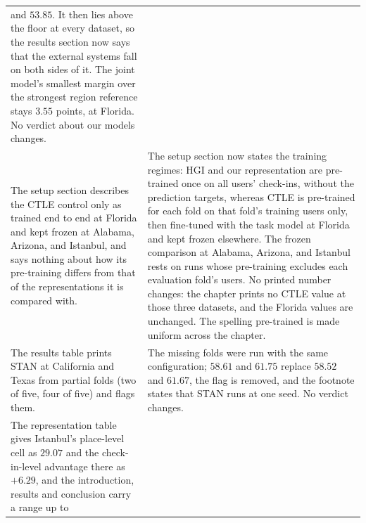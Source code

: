 \begin{table}[htb]
\begin{tabular}{@{}p{}p{}@{}}
and $53.85$. It then lies above the floor at every dataset, so
the results section now says that the external systems fall on
both sides of it. The joint model's smallest margin over the
strongest region reference stays $3.55$ points, at Florida. No
verdict about our models changes. \\
\addlinespace
The setup section describes the CTLE control only as trained
end to end at Florida and kept frozen at Alabama, Arizona, and
Istanbul, and says nothing about how its pre-training differs
from that of the representations it is compared with. &
The setup section now states the training regimes: HGI and
our representation are pre-trained once on all users' check-ins,
without the prediction targets, whereas CTLE is pre-trained for
each fold on that fold's training users only, then fine-tuned
with the task model at Florida and kept frozen elsewhere. The
frozen comparison at Alabama, Arizona, and Istanbul rests on
runs whose pre-training excludes each evaluation fold's users.
No printed number changes: the chapter prints no CTLE value at
those three datasets, and the Florida values are unchanged. The
spelling pre-trained is made uniform across the chapter. \\
\addlinespace
The results table prints STAN at California and Texas from
partial folds (two of five, four of five) and flags them. &
The missing folds were run with the same configuration; $58.61$
and $61.75$ replace $58.52$ and $61.67$, the flag is removed, and
the footnote states that STAN runs at one seed. No verdict changes. \\
\addlinespace
The representation table gives Istanbul's place-level cell as
$29.07$ and the check-in-level advantage there as $+6.29$, and
the introduction, results and conclusion carry a range up to

\end{tabular}
\end{table}
